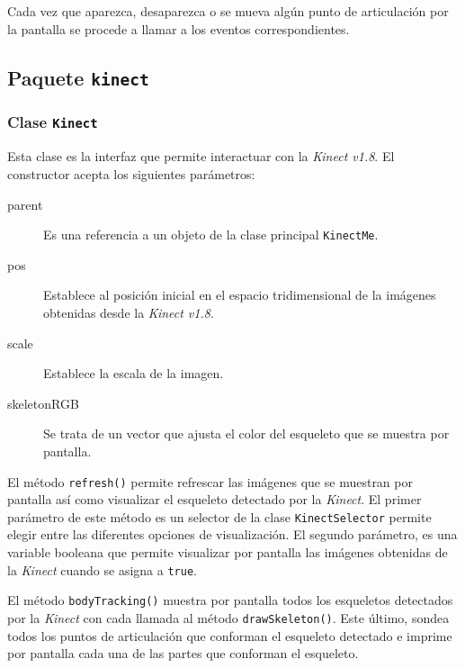 \documentclass[10pt,a4paper]{report}
\begin{document}
	 Cada vez que aparezca, desaparezca o se mueva algún punto de articulación por la pantalla se procede a llamar a los eventos correspondientes.
	 
	 
	
	
	\subsection{Paquete \texttt{kinect}}
	\subsubsection{Clase \texttt{Kinect}}\label{class:kinect}
	Esta clase es la interfaz que permite interactuar con la \textit{Kinect v1.8}. El constructor acepta los siguientes parámetros:
	\begin{description}
	\item[parent] Es una referencia a un objeto de la clase principal \texttt{KinectMe}.
	\item[pos] Establece al posición inicial en el espacio tridimensional de la imágenes obtenidas desde la \textit{Kinect v1.8}.
	\item[scale] Establece la escala de la imagen.
	\item[skeletonRGB] Se trata de un vector que ajusta el color del esqueleto que se muestra por pantalla.
	\end{description}
	
	
	
	El método \texttt{refresh()} permite refrescar las imágenes que se muestran por pantalla así como visualizar el esqueleto detectado por la \textit{Kinect}. El primer parámetro de este método es un selector de la clase \texttt{KinectSelector} permite elegir entre las diferentes opciones de visualización. El segundo parámetro, es una variable booleana que permite visualizar por pantalla las imágenes obtenidas de la \textit{Kinect} cuando se asigna a \texttt{true}.
	
	
	
	El método \texttt{bodyTracking()} muestra por pantalla todos los esqueletos detectados por la \textit{Kinect} con cada llamada al método \texttt{drawSkeleton()}. Este último, sondea todos los puntos de articulación que conforman el esqueleto detectado e imprime por pantalla cada una de las partes que conforman el esqueleto.
	
\end{document}

